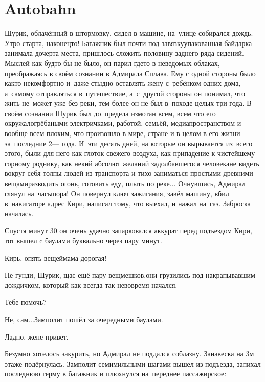 \chapter{Autobahn}
\vepsianrose

Шурик, облачённый в штормовку, сидел в машине, на~улице собирался дождь. Утро старта, наконец\sdash то! Багажник был почти под завязку\mdash упакованная байдарка занимала дочерта места, пришлось сложить половину заднего ряда сидений. Мыслей как будто бы не было, он парил где\sdash то в неведомых облаках, преображаясь в своём сознании в Адмирала Сплава. Ему с одной стороны было как\sdash то некомфортно и~даже стыдно оставлять жену с~ребёнком одних дома, а~самому отправляться в~путешествие, а~с~другой стороны он понимал, что жить не~может уже без реки, тем более он не был в~походе целых три года. В своём сознании Шурик был до~предела измотан всем, всем что его окружало\mdash грёбаными электричками, работой, семьёй, медиапространством и вообще всем плохим, что произошло в мире, стране и в целом в его жизни за~последние 2\thinspace\nobreakdash--- года. И~эти десять дней, на которые он вырывается из~всего этого, были для него как глоток свежего воздуха, как припадение к чистейшему горному роднику, как некий абсолют желаний задолбавшегося человека\mdash не видеть вокруг себя толпы людей из транспорта и тихо заниматься простыми древними вещами\mdash разводить огонь, готовить еду, плыть по реке$\ldots$ Очнувшись, Адмирал глянул на~часы\mdash пора! Он повернул ключ зажигания, завёл машину, вбил в~навигаторе адрес Кири, написал тому, что выехал, и нажал на~газ. Заброска началась.

Спустя минут 30 он очень удачно запарковался аккурат перед подъездом Кири, тот вышел c баулами буквально через пару минут.

\diagdash Кирь, опять вещей\mdash мама дорогая!

\diagdash Не гунди, Шурик, щас ещё пару вещмешков.\mdash они грузились под накрапывавшим дождичком, который как всегда так невовремя начался.

\diagdash Тебе помочь?

\diagdash Не, сам$\ldots$\mdash Замполит пошёл за очередными баулами.

\diagdash Ладно, жене привет.

Безумно хотелось закурить, но Адмирал не поддался соблазну. Занавеска на 3\sdash м этаже подёрнулась. Замполит семимильными шагами вышел из подъезда, запихал последнюю герму в багажник и плюхнулся на~переднее пассажирское:

